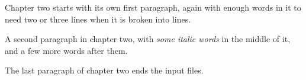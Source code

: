 Chapter two starts with its own first paragraph, again with enough words
in it to need two or three lines when it is broken into lines.

A second paragraph in chapter two, with {\it some italic words} in the
middle of it, and a few more words after them.

The last paragraph of chapter two ends the input files.
